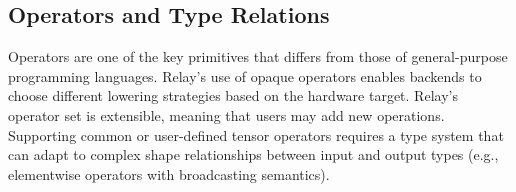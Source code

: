 %

\subsection*{Operators and Type Relations}
Operators are one of the key primitives that differs from those of
general-purpose programming languages.
Relay's use of opaque operators enables backends to choose different
lowering strategies based on the hardware target.
Relay's operator set is extensible, meaning that users may add new operations.
Supporting common or user-defined tensor operators requires a type system that can
adapt to complex shape relationships between input and output types
(e.g., elementwise operators with broadcasting semantics).

